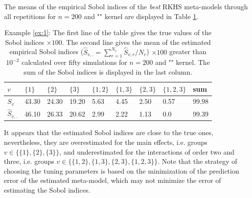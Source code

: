 The means of the empirical Sobol indices of the \textit{best} RKHS meta-models through all repetitions for $n=200$ and "" kernel are displayed in Table \ref{trueSI}. 
\begin{table}[h!]
\centering
\small{
{\setlength{\tabcolsep}{4pt}
\begin{tabular}{l|lllllll|l} 
 $v$ & $\{1\}$ & $\{2\}$ & $\{3\}$ & $\{1,2\}$ & $\{1,3\}$ & $\{2,3\}$ & $\{1,2,3\}$ & sum\\ \hline
 $S_v$ & 43.30 & 24.30 & 19.20 & 5.63 & 4.45 & 2.50 & 0.57 & 99.98\\ \hline
 $\widehat{S}_{v,.}$  & 46.10 & 26.33 & 20.62 & 2.99 & 2.22 & 1.13 & 0.0 & 99.39\\                                                                 
\end{tabular}}}
\caption{Example \ref{ex:1}: The first line of the table gives the true values of the Sobol indices
$\times100$. The second line gives the mean of the estimated empirical Sobol indices ($\widehat{S}_{v,.}=\sum_{r=1}^{N_r}\widehat{S}_{v,r}/N_r$) $\times100$ greater than $10^{-2}$ calculated over fifty simulations for $n=200$ and "" kernel. The sum of the Sobol indices is displayed in the last column.}
\label{trueSI}
\end{table}  
It appears that the estimated Sobol indices are close to the true ones, nevertheless, they are overestimated for the main effects, i.e. groups $v\in\{\{1\},\{2\},\{3\}\}$, and underestimated for the interactions of order two and three, i.e. groups $v\in\{\{1,2\},\{1,3\},\{2,3\},\{1,2,3\}\}$.
Note that the strategy of choosing the tuning parameters is based on the minimization of the prediction error of the estimated meta-model, which may not minimize the error of estimating the Sobol indices.

